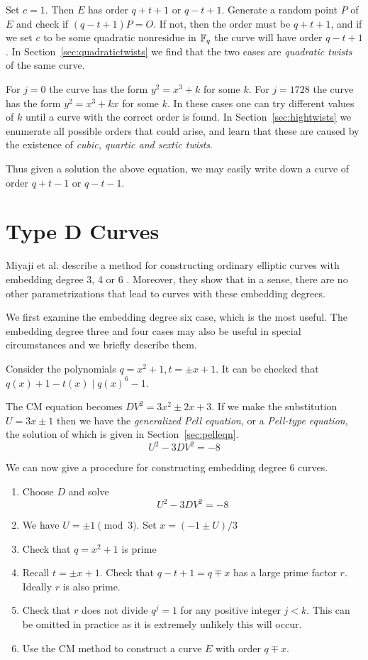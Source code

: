 Set $c = 1$. Then $E$ has order $q + t + 1$ or $q - t + 1$.
Generate a random point $P$ of $E$ and check if
$(q-t+1)P = O$. If not, then the order must be $q + t + 1$,
and if we set $c$ to be some quadratic nonresidue in $\mathbb{F}_q$ the
curve will have order $q - t + 1$.
In Section~\ref{sec:quadratictwists} we find that the two cases
are \emph{quadratic twists} of the same curve.

For $j = 0$ the curve has the form $y^2 = x^3 + k$ for some $k$.
For $j = 1728$ the curve has the form $y^2 = x^3 + k x$ for some $k$.
In these cases one can try different values of $k$ until a curve
with the correct order is found.
In Section~\ref{sec:hightwists} we enumerate all possible orders
that could arise, and learn that these are caused by the existence
of \emph{cubic, quartic and sextic twists}.

Thus given a solution the above equation, we may easily write down
a curve of order $q+t-1$ or $q-t-1$.

\section {Type D Curves}

Miyaji et al. describe a method for constructing ordinary elliptic
curves with embedding degree 3, 4 or 6 \cite{mnt}. Moreover, they show
that in a sense, there are no other parametrizations that lead to curves
with these embedding degrees.

We first examine the embedding degree six case, which is the most useful.
The embedding degree three and four cases may also be useful in special
circumstances and we briefly describe them.

Consider the polynomials $q = x^2 + 1, t = \pm x + 1$.
It can be checked that $q(x) + 1 - t(x) \mid q(x)^6 - 1$.

The CM equation becomes $D V^2 = 3 x^2 \pm 2 x + 3$. If we make
the substitution $U = 3x \pm 1$ then we have
the \emph{generalized Pell equation}, or a \emph{Pell-type
equation}, the solution of which is given in Section~\ref{sec:pelleqn}.
\[
U^2 - 3DV^2 = -8
\]

We can now give a procedure for constructing embedding degree 6 curves.

\begin{enumerate}
\item
Choose $D$ and solve
\[ U^2 - 3DV^2 = -8 \]
\item
We have $U = \pm 1 \pmod 3$. Set $x = (-1 \pm U) / 3$
\item
Check that $q = x^2 + 1$ is prime
\item
Recall $t = \pm x + 1$.
Check that $q - t + 1 = q \mp x$ has a large prime factor $r$.
Ideally $r$ is also prime.
\item
Check that $r$ does not divide $q^j = 1$ for any positive integer $j < k$.
This can be omitted in practice as it is extremely unlikely this will
occur.
\item
Use the CM method to construct a curve $E$ with order $q \mp x$.
\end{enumerate}

